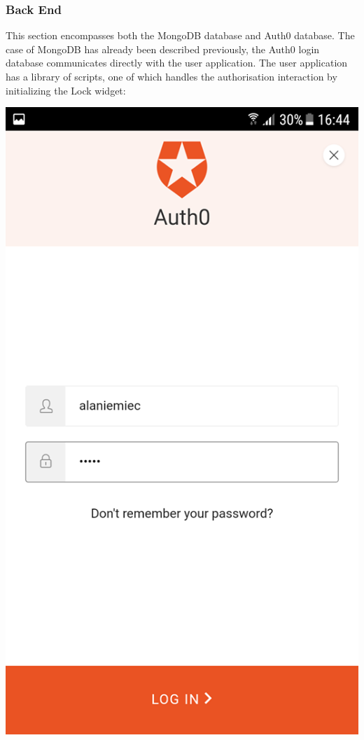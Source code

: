 \subsubsection{Back End}
    This section encompasses both the MongoDB database and Auth0 database. The case of MongoDB has already been described previously, the Auth0 login database communicates directly with the user application.
    The user application has a library of scripts, one of which handles the authorisation interaction by initializing the Lock widget:
\begin{center}
\includegraphics[scale=0.5]{img/2authlogindetails.png}
\end{center}
